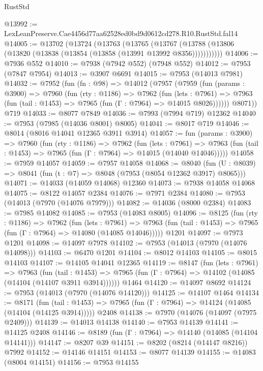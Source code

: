 \begin{lexlean}{RustStd}
\begin{coremodule}
@13992 := LexLeanPreserve.Cae4456d77aa62528ed0bd9d0612cd278.R10.RustStd.fal14
@14005 := @13702
    (@13724
      (@13763
        (@13765
          (@13767 (@13788 (@13806 (@13820 (@13838 (@13854 (@13858 (@13991 @13992 @8356)))))))))))
@14006 := @7936 @552
@14010 := @7938 (@7942 @552) (@7948 @552)
@14012 := @7953 (@7847 @7954)
@14013 := @3907 @6691
@14015 := @7953 (@14013 @7981)
@14032 := @7952
    (fun (fn : @98) =>
    @14012
      (@7957
        (@7959
          (fun (params : @3900) =>
          @7960
            (fun (rty : @1186) =>
            @7962
              (fun (lets : @7961) =>
              @7963 (fun (tail : @1453) => @7965 (fun (Γ : @7964) => @14015 @8026))))))
        @8071))
    @719
@14033 := @8077 @7849
@14036 := @7993 (@7994 @719) @12362
@14040 := @7953 (@7985 (@14036 @8001) @8005)
@14041 := @8017 @719
@14046 := @8014 (@8016 @14041 @12365 @3911 @3914)
@14057 := fun (params : @3900) =>
  @7960
    (fun (rty : @1186) =>
    @7962
      (fun (lets : @7961) =>
      @7963 (fun (tail : @1453) => @7965 (fun (Γ : @7964) => @14015 (@14040 @14046)))))
@14058 := @7959 @14057
@14059 := @7957 @14058
@14068 := @8040
    (fun (U : @8039) => @8041 (fun (t : @7) => @8048 (@7953 (@8054 @12362 @3917) @8065)))
@14071 := @14033 (@14059 @14068) @12360
@14073 := @7938 @14058 @14068
@14075 := @8122 @14057 @2384
@14076 := @7971 @2384
@14080 := @7953 (@14013 (@7970 (@14076 @7979)))
@14082 := @14036 (@8000 @2384)
@14083 := @7985 @14082
@14085 := @7953 (@14083 @8005)
@14096 := @8125
    (fun (rty : @1186) =>
    @7962
      (fun (lets : @7961) =>
      @7963 (fun (tail : @1453) => @7965 (fun (Γ : @7964) => @14080 (@14085 @14046)))))
    @1201
@14097 := @7973 @1201
@14098 := @14097 @7978
@14102 := @7953 (@14013 (@7970 (@14076 @14098)))
@14103 := @6470 @1201
@14104 := @8012 @14103
@14105 := @8015 @14103
@14107 := @14105 @14041 @12365
@14119 := @8147
    (fun (lets : @7961) =>
    @7963
      (fun (tail : @1453) =>
      @7965 (fun (Γ : @7964) => @14102 (@14085 (@14104 (@14107 @3911 @3914))))))
    @1464
@14120 := @14097 @8692
@14124 := @7953 (@14013 (@7970 (@14076 @14120)))
@14125 := @14107 @1464
@14134 := @8171
    (fun (tail : @1453) => @7965 (fun (Γ : @7964) => @14124 (@14085 (@14104 (@14125 @3914)))))
    @2408
@14138 := @7970 (@14076 (@14097 (@7975 @2409)))
@14139 := @14013 @14138
@14140 := @7953 @14139
@14141 := @14125 @2408
@14146 := @8189 (fun (Γ : @7964) => @14140 (@14085 (@14104 @14141)))
@14147 := @8207 @39
@14151 := @8202 (@8214 (@14147 @8216)) @7992
@14152 := @14146 @14151
@14153 := @8077 @14139
@14155 := @14083 (@8004 @14151)
@14156 := @7953 @14155

\end{coremodule}
\end{lexlean}
